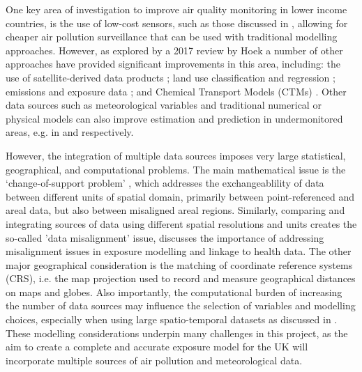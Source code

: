 One key area of investigation to improve air quality monitoring in lower income countries, is the use of low-cost sensors, such as those discussed in \cite{Avis2020MonitoringCountries}, allowing for cheaper air pollution surveillance that can be used with traditional modelling approaches. However, as explored by a 2017 review by Hoek \citep{Hoek2017MethodsPollutants} a number of other approaches have provided significant improvements in this area, including: the use of satellite-derived data products \citep{Militino2018AnGeostatisticians, Zakeri2021AApplications, Zhang2021SatellitePerspectives}; land use classification and regression \citep{Knibbs2014AAustralia, VandenBossche2020ACarbon, Wang2020SpatiotemporalScale}; emissions and exposure data \citep{Saikawa2014GlobalN2Ob, Streets2013EmissionsCapability}; and Chemical Transport Models (CTMs) \citep{Beloconi2020BayesianModels, Chianese2018SpatiotemporallySimulations}. Other data sources such as meteorological variables and traditional numerical or physical models can also improve estimation and prediction in undermonitored areas, e.g. in \cite{Fasbender2009BayesianBelgium} and \cite{McMillan2010CombiningModelingd} respectively. 

However, the integration of multiple data sources imposes very large statistical, geographical, and computational problems. The main mathematical issue is the ‘change-of-support problem’ \citep{Gelfand2001OnData}, which addresses the exchangeablility of data between different units of spatial domain, primarily between point-referenced and areal data, but also between misaligned areal regions. Similarly, comparing and integrating sources of data using different spatial resolutions and units creates the so-called 'data misalignment' issue, \cite{Cameletti2019BayesianApproach} discusses the importance of addressing misalignment issues in exposure modelling and linkage to health data. The other major geographical consideration is the matching of coordinate reference systems (CRS), i.e. the map projection used to record and measure geographical distances on maps and globes. Also importantly, the computational burden of increasing the number of data sources may influence the selection of variables and modelling choices, especially when using large spatio-temporal datasets as discussed in \cite{Shekhar2015}. These modelling considerations underpin many challenges in this project, as the aim to create a complete and accurate exposure model for the UK will incorporate multiple sources of air pollution and meteorological data. 


